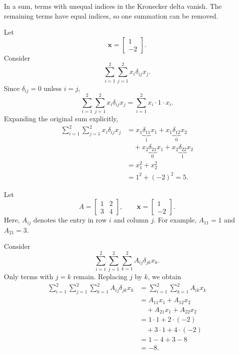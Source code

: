 In a sum, terms with unequal indices in the
Kronecker delta vanish. The remaining terms have
equal indices, so one summation can be removed.

\begin{example}
	Let
	\[
		\mathbf{x}=
		\begin{bmatrix}1\\-2\end{bmatrix}.
	\]
	Consider
	\[
		\sum_{i=1}^{2}\sum_{j=1}^{2}
		x_i\delta_{ij}x_j.
	\]
	Since \(\delta_{ij}=0\) unless \(i=j\),
	\[
		\sum_{i=1}^{2}\sum_{j=1}^{2}
		x_i\delta_{ij}x_j
		=\sum_{i=1}^{2}x_i\cdot1\cdot x_i.
	\]
	Expanding the original sum explicitly,
	\begin{align*}
		\sum_{i=1}^{2}\sum_{j=1}^{2}
		x_i\delta_{ij}x_j
		 & =
		x_1\underbrace{\delta_{11}}_{1}x_1
		+x_1\underbrace{\delta_{12}}_{0}x_2 \\
		 & \quad
		+x_2\underbrace{\delta_{21}}_{0}x_1
		+x_2\underbrace{\delta_{22}}_{1}x_2 \\
		 & =x_1^2+x_2^2                     \\
		 & =1^2+(-2)^2=5.
	\end{align*}
\end{example}

\begin{example}
	Let
	\[
		A=\begin{bmatrix}1&2\\3&4\end{bmatrix},
		\qquad
		\mathbf{x}=\begin{bmatrix}1\\-2\end{bmatrix}.
	\]
	Here, \(A_{ij}\) denotes the entry in row \(i\)
	and column \(j\). For example,
	\(A_{11}=1\) and \(A_{21}=3\).

	Consider
	\[
		\sum_{i=1}^{2}\sum_{j=1}^{2}\sum_{k=1}^{2}
		A_{ij}\delta_{jk}x_k.
	\]
	Only terms with \(j=k\) remain. Replacing \(j\)
	by \(k\), we obtain
	\begin{align*}
		\sum_{i=1}^{2}\sum_{j=1}^{2}\sum_{k=1}^{2}
		A_{ij}\delta_{jk}x_k
		 & =
		\sum_{i=1}^{2}\sum_{k=1}^{2}A_{ik}x_k \\
		 & =A_{11}x_1+A_{12}x_2               \\
		 & \quad+A_{21}x_1+A_{22}x_2          \\
		 & =1\cdot1+2\cdot(-2)                \\
		 & \quad+3\cdot1+4\cdot(-2)           \\
		 & =1-4+3-8                           \\
		 & =-8.
	\end{align*}
\end{example}

